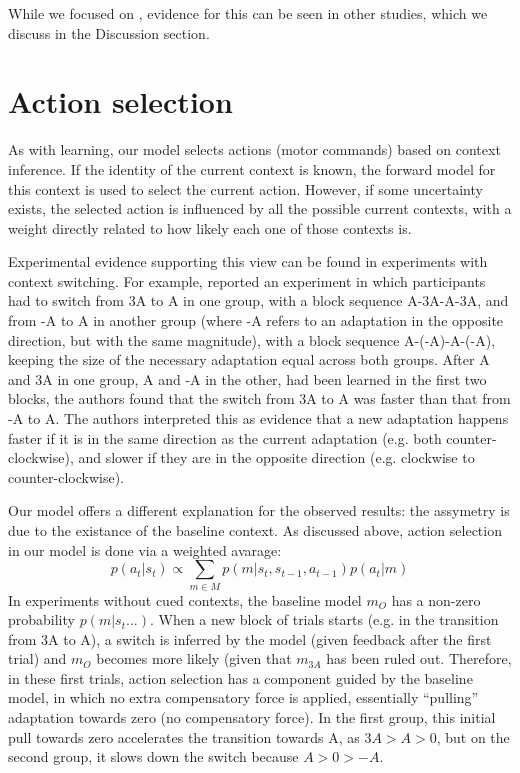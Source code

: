 \documentclass[a4paper,doc,floatsintext,natbib]{apa6}
\begin{document}
While we focused on \cite{Herzfeld_memory_2014}, evidence for this can be seen in other studies, which we discuss in the Discussion section.

\section{Action selection}
As with learning, our model selects actions (motor commands) based on context inference. If the identity of the current context is known, the forward model for this context is used to select the current action. However, if some uncertainty exists, the selected action is influenced by all the possible current contexts, with a weight directly related to how likely each one of those contexts is.

Experimental evidence supporting this view can be found in experiments with context switching. For example, \cite{Davidson_Scaling_2004} reported an experiment in which participants had to switch from 3A to A in one group, with a block sequence A-3A-A-3A, and from -A to A in another group (where -A refers to an adaptation in the opposite direction, but with the same magnitude), with a block sequence A-(-A)-A-(-A), keeping the size of the necessary adaptation equal across both groups. After A and 3A in one group, A and -A in the other, had been learned in the first two blocks, the authors found that the switch from 3A to A was faster than that from -A to A. The authors interpreted this as evidence that a new adaptation happens faster if it is in the same direction as the current adaptation (e.g. both counter-clockwise), and slower if they are in the opposite direction (e.g. clockwise to counter-clockwise).

Our model offers a different explanation for the observed results: the assymetry is due to the existance of the baseline context. As discussed above, action selection in our model is done via a weighted avarage:
\begin{equation}
p(a_t | s_t) \propto \displaystyle \sum_{m \in M} p(m | s_t, s_{t-1}, a_{t-1}) p(a_t | m)
\end{equation}
In experiments without cued contexts, the baseline model $m_O$ has a non-zero probability $p(m | s_t ...)$. When a new block of trials starts (e.g. in the transition from 3A to A), a switch is inferred by the model (given feedback after the first trial) and $m_O$ becomes more likely (given that $m_{3A}$ has been ruled out. Therefore, in these first trials, action selection has a component guided by the baseline model, in which no extra compensatory force is applied, essentially ``pulling'' adaptation towards zero (no compensatory force). In the first group, this initial pull towards zero accelerates the transition towards A, as $3A > A > 0$, but on the second group, it slows down the switch because $A > 0 > -A$.
\end{document}
